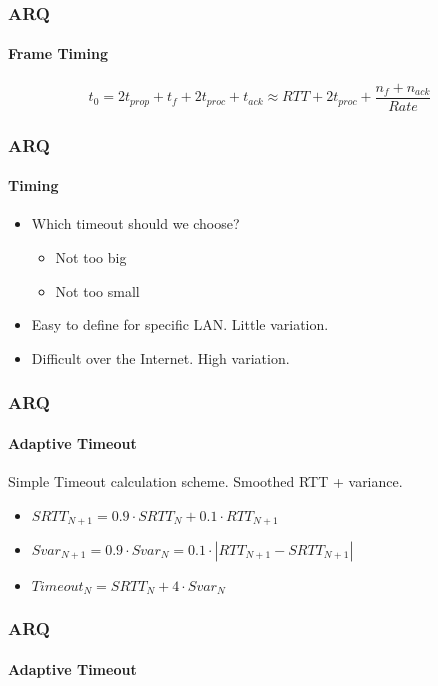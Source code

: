 \begin{frame}		
	
	\frametitle{ARQ}
	\framesubtitle{Frame Timing}
	
	\begin{figure}[H]
	\end{figure}
	
	$$t_0 = 2t_{prop} + t_f + 2t_{proc} + t_{ack} \approx RTT + 2t_{proc} + \dfrac{n_f + n_{ack}}{Rate}$$
	
\end{frame}

\begin{frame}		
	\frametitle{ARQ}
	\framesubtitle{Timing}
	
	
	\begin{itemize}
		\item Which timeout should we choose?
		\begin{itemize}
			\item Not too big
			\item Not too small
		\end{itemize}
		\item Easy to define for specific LAN. Little variation. 
		\item Difficult over the Internet. High variation.
	\end{itemize}
	
	
\end{frame}


\begin{frame}		
	\frametitle{ARQ}
	\framesubtitle{Adaptive Timeout}
	
	Simple Timeout calculation scheme\footnotemark[1]. Smoothed RTT + variance.
	
	\begin{itemize}
		\item $SRTT_{N+1} = 0.9 \cdot SRTT_N + 0.1 \cdot RTT_{N+1}$
		\item $Svar_{N+1} = 0.9 \cdot Svar_N = 0.1 \cdot |RTT_{N+1} - SRTT_{N+1}|$
		\item $Timeout_N = SRTT_N + 4 \cdot Svar_N$
	\end{itemize}
\end{frame}

\begin{frame}		
	\frametitle{ARQ}
	\framesubtitle{Adaptive Timeout}
	
	\begin{figure}[H]
	\end{figure}

\end{frame}